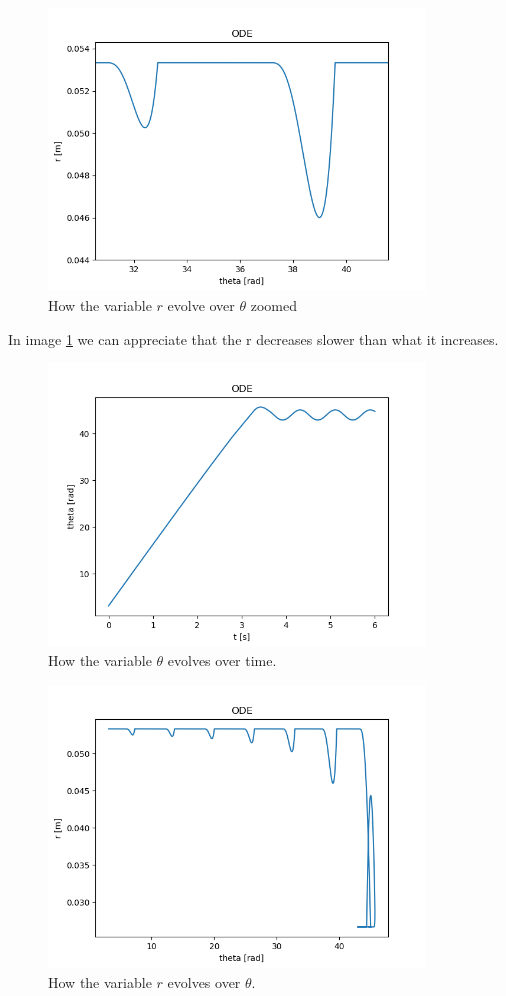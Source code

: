 \begin{figure}[H]
	\centering
	\includegraphics[width=10cm]{img/simulation/r_theta_t_zoom.png}
	\caption{How the variable $r$ evolve over $\theta$ zoomed}
	\label{fig:r theta zoom}
\end{figure}
In image \ref{fig:r theta zoom} we can appreciate that the r decreases slower than what it increases.


\begin{figure}[H]
	\centering
	\includegraphics[width=10cm]{img/simulation/theta_t.png}
	\caption{How the variable $\theta$ evolves over time.}
	\label{fig:theta t diagram}
\end{figure}

\begin{figure}[H]
	\centering
	\includegraphics[width=10cm]{img/simulation/r_theta_t.png}
	\caption{How the variable $r$ evolves over $\theta$.}
	\label{fig:r theta}
\end{figure}

